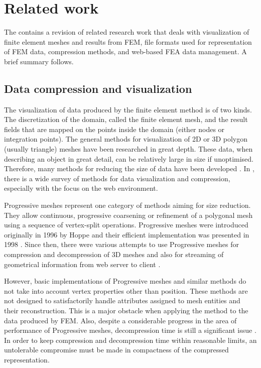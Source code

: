 \section{Related work}

The contains a revision of related research work that deals with visualization of finite element meshes and results from FEM, file formats used for representation of FEM data, compression methods, and web-based FEA data management. A brief summary follows.


\subsection{Data compression and visualization}

The visualization of data produced by the finite element method is of two kinds. The discretization of the domain, called the finite element mesh, and the result fields that are mapped on the points inside the domain (either nodes or integration points). The general methods for visualization of 2D or 3D polygon (usually triangle) meshes have been researched in great depth. These data, when describing an object in great detail, can be relatively large in size if unoptimised. Therefore, many methods for reducing the size of data have been developed \cite{Alliez2005}. In \cite{Evans2014}, there is a wide survey of methods for data visualization and compression, especially with the focus on the web environment.

Progressive meshes represent one category of methods aiming for size reduction. They allow continuous, progressive coarsening or refinement of a polygonal mesh using a sequence of vertex-split operations. Progressive meshes were introduced originally in 1996 by Hoppe \cite{Hoppe1996} and their efficient implementation was presented in 1998 \cite{Hoppe1998}. Since then, there were various attempts to use Progressive meshes for compression and decompression of 3D meshes \cite{Gudukbay2002, Valette2004, Valette2009, Lavoue2013} and also for streaming of geometrical information from web server to client \cite{Alliez2001, Maglo2012}.

However, basic implementations of Progressive meshes and similar methods do not take into account vertex properties other than position. These methods are not designed to satisfactorily handle attributes assigned to mesh entities and their reconstruction. This is a major obstacle when applying the method to the data produced by FEM. Also, despite a considerable progress in the area of performance of Progressive meshes, decompression time is still a significant issue \cite{Limper2013}. In order to keep compression and decompression time within reasonable limits, an untolerable compromise must be made in compactness of the compressed representation.

